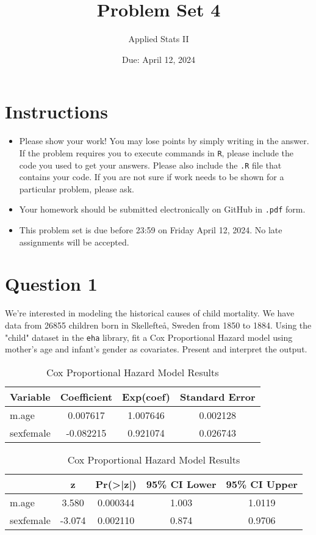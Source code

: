 \documentclass[12pt,letterpaper]{article}
\title{Problem Set 4}
\date{Due: April 12, 2024}
\author{Applied Stats II}
\begin{document}
	\maketitle
	\section*{Instructions}
	\begin{itemize}
	\item Please show your work! You may lose points by simply writing in the answer. If the problem requires you to execute commands in \texttt{R}, please include the code you used to get your answers. Please also include the \texttt{.R} file that contains your code. If you are not sure if work needs to be shown for a particular problem, please ask.
	\item Your homework should be submitted electronically on GitHub in \texttt{.pdf} form.
	\item This problem set is due before 23:59 on Friday April 12, 2024. No late assignments will be accepted.

	\end{itemize}

	\vspace{.25cm}
\section*{Question 1}
\vspace{.25cm}
\noindent We're interested in modeling the historical causes of child mortality. We have data from 26855 children born in Skellefteå, Sweden from 1850 to 1884. Using the "child" dataset in the \texttt{eha} library, fit a Cox Proportional Hazard model using mother's age and infant's gender as covariates. Present and interpret the output.

		 
		\begin{table}[htbp]
			\centering
			\caption{Cox Proportional Hazard Model Results}
			\begin{tabular}{lccc}
				\hline
				\textbf{Variable} & \textbf{Coefficient} & \textbf{Exp(coef)} & \textbf{Standard Error} \\ \hline
				m.age & 0.007617 & 1.007646 & 0.002128 \\
				sexfemale & -0.082215 & 0.921074 & 0.026743 \\ \hline
			\end{tabular}
			\begin{tabular}{lcccc}
				\hline
				& \textbf{z} & \textbf{Pr(\textgreater |z|)} & \textbf{95\% CI Lower} & \textbf{95\% CI Upper} \\ \hline
				m.age & 3.580 & 0.000344 & 1.003 & 1.0119 \\
				sexfemale & -3.074 & 0.002110 & 0.874 & 0.9706 \\ \hline
			\end{tabular}
			\label{tab:cox_results}
		\end{table}
		
\end{document}
